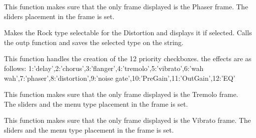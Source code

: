 \documentclass[letterpaper,10pt,english]{sphinxmanual}
\begin{document}
\begin{fulllineitems}
\label{Code:GUI.Phaser}
This function makes sure that the only frame displayed is the Phaser frame. The sliders placement 
in the frame is set.

\end{fulllineitems}


\begin{fulllineitems}
\label{Code:GUI.ROCK_val}
Makes the Rock type selectable for the Distortion and displays it if selected. Calls the outp function and saves the selected 
type on the string.

\end{fulllineitems}


\begin{fulllineitems}
\label{Code:GUI.SetPriority}
This function handles the creation of the 12 priority checkboxes.
the effects are as follows: 1:'delay',2:'chorus',3:'flanger',4:'tremolo',5:'vibrato',6:'wah wah',7:'phaser',8:'distortion',9:'noise gate',10:'PreGain',11:'OutGain',12:'EQ'

\end{fulllineitems}


\begin{fulllineitems}
\label{Code:GUI.Tremolo}
This function makes sure that the only frame displayed is the Tremolo frame. The sliders and the menu type placement 
in the frame is set.

\end{fulllineitems}


\begin{fulllineitems}
\label{Code:GUI.Vibrato}
This function makes sure that the only frame displayed is the Vibrato frame. The sliders and the menu type placement 
in the frame is set.

\end{fulllineitems}

\end{document}
